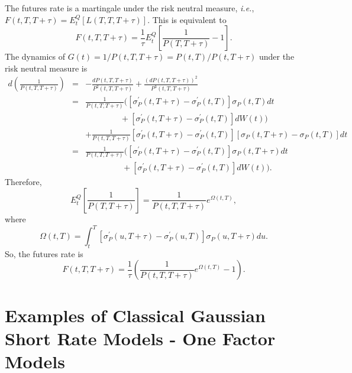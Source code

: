 \documentclass[12pt]{article}
\begin{document}
    The futures rate is a martingale under the risk neutral measure, {\it i.e.}, $F(t,T,T+\tau)=E_t^Q[L(T,T,T+\tau)]$.
    This is equivalent to
    \begin{equation}
      F(t,T,T+\tau)=\frac{1}{\tau}E_t^Q\left[\frac{1}{P(T,T+\tau)}-1\right].
    \end{equation}
    The dynamics of $G(t)=1/P(t,T,T+\tau)=P(t,T)/P(t,T+\tau)$ under the risk neutral measure is
    \begin{eqnarray}
      d\left(\frac{1}{P(t,T,T+\tau)}\right)&=&-\frac{dP(t,T,T+\tau)}{P^2(t,T,T+\tau)}+\frac{\left(dP(t,T,T+\tau)\right)^2}{P^3(t,T,T+\tau)}\nonumber\\
                &=&\frac{1}{P(t,T,T+\tau)}\Big(\left[\sigma_P^{\prime}(t,T+\tau)-\sigma_P^{\prime}(t,T)\right]\sigma_P(t,T)dt\nonumber\\
                && \ \ \ \ \ \ \ \ \ \ \ \ \ \ \  \ \ \ \ +\left[\sigma_P^{\prime}(t,T+\tau)-\sigma_P^{\prime}(t,T)\right]dW(t)\Big)\nonumber\\
                && + \frac{1}{P(t,T,T+\tau)}\left[\sigma_P^{\prime}(t,T+\tau)-\sigma_P^{\prime}(t,T)\right]\left[\sigma_P(t,T+\tau)-\sigma_P(t,T)\right]dt\nonumber\\
                &=&\frac{1}{P(t,T,T+\tau)}\Big(\left[\sigma_P^{\prime}(t,T+\tau)-\sigma_P^{\prime}(t,T)\right]\sigma_P(t,T+\tau)dt\nonumber\\
                && \ \ \ \ \ \ \ \ \ \ \ \ \ \ \ \ \ \ \ \ +\left[\sigma_P^{\prime}(t,T+\tau)-\sigma_P^{\prime}(t,T)\right]dW(t)\Big).
    \end{eqnarray}
    Therefore,
    \begin{equation}
      E_t^Q\left[\frac{1}{P(T,T+\tau)}\right]=\frac{1}{P(t,T,T+\tau)}e^{\Omega(t,T)},
    \end{equation}
    where
    \begin{equation}
      \Omega(t,T)=\int_t^T\left[\sigma_P^{\prime}(u,T+\tau)-\sigma_P^{\prime}(u,T)\right]\sigma_P(u,T+\tau)du.
    \end{equation}
    So, the futures rate is
    \begin{equation}
      F(t,T,T+\tau)=\frac{1}{\tau}\left(\frac{1}{P(t,T,T+\tau)}e^{\Omega(t,T)}-1\right).
    \end{equation}
    
\section{Examples of Classical Gaussian Short Rate Models - One Factor Models}
\end{document}
